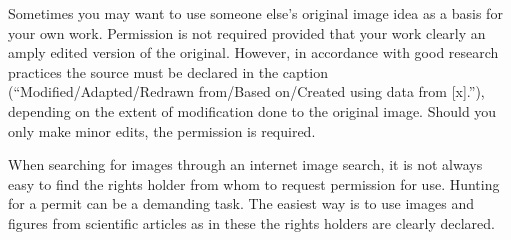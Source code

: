 Sometimes you may want to use someone else's original image idea as a basis for your own
work. Permission is not required provided that your work clearly an amply edited version of
the original. However, in accordance with good research practices the source must be declared
in the caption (“Modified/Adapted/Redrawn from/Based on/Created using data from [x].”), depending on
the extent of modification done to the original image. Should you only make minor edits, the permission is required.

When searching for images through an internet image search, it is not always easy to find
the rights holder from whom to request permission for use. Hunting for a permit can be a
demanding task. The easiest way is to use images and figures from scientific articles as in these
the rights holders are clearly declared.
